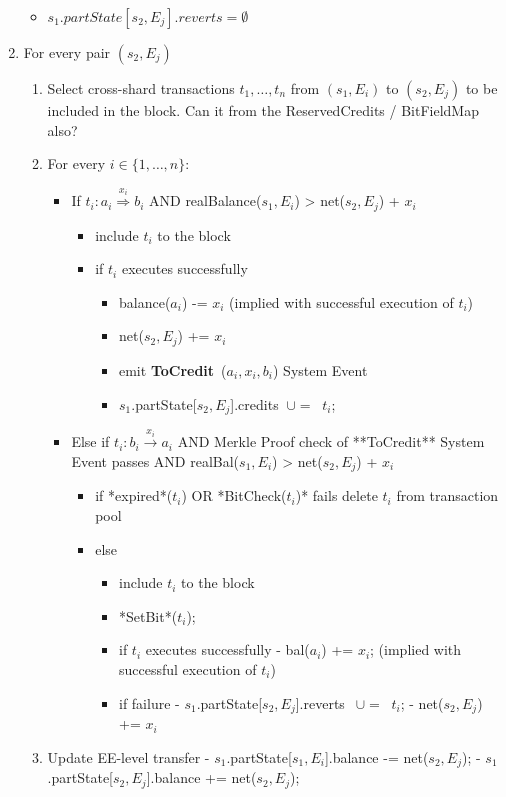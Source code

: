 \documentclass{article}
\newcommand{\tocredit}[0]{{\bf ToCredit}~}
\begin{document}
\begin{enumerate}
\begin{itemize}
	\item $s_1.partState[s_2,E_j].reverts = \emptyset$
\end{itemize}
\item For every pair $(s_2,E_j)$
    \begin{enumerate}
	\item Select cross-shard transactions $t_1,\ldots,t_n$ from $(s_1,E_i)$ to $(s_2,E_j)$ to be included in the block. Can it from the ReservedCredits / BitFieldMap also?
	\item For every $i \in \{1, \ldots, n\}$: 
		\begin{itemize}
		\item If $t_i : a_i \stackrel{x_i}{\Longrightarrow} b_i$ AND realBalance($s_1,E_i$) > net($s_2,E_j$) + $x_i$
		\begin{itemize}
			\item include $t_i$ to the block
			\item if $t_i$ executes successfully 
			\begin{itemize}
				\item balance($a_i$) -= $x_i$ (implied with successful execution of $t_i$)
				\item net($s_2,E_j$) += $x_i$
				\item emit \tocredit($a_i, x_i, b_i$) System Event
				\item $s_1$.partState[$s_2,E_j$].credits $~ \cup= ~$ {$t_i$};
			\end{itemize}
		\end{itemize}
		\item Else if $t_i : b_i \stackrel{x_i}{\longrightarrow} a_i$ AND Merkle Proof check of **ToCredit** System Event passes AND realBal($s_1,E_i$) > net($s_2,E_j$) + $x_i$
		\begin{itemize}
			\item if *expired*($t_i$) OR *BitCheck($t_i$)* fails
				 delete $t_i$ from transaction pool
			\item else 
			\begin{itemize}
				\item include $t_i$ to the block
				\item *SetBit*($t_i$);
				\item if $t_i$ executes successfully
					- bal($a_i$) += $x_i$; (implied with successful execution of $t_i$)
				\item if failure 
					- $s_1$.partState[$s_2,E_j$].reverts $~~\cup=~$ {$t_i$};
					- net($s_2,E_j$) += $x_i$ 
			\end{itemize}
		\end{itemize}
	\end{itemize}
	\item Update EE-level transfer
		- $s_1$.partState[$s_1,E_i$].balance -= net($s_2,E_j$); 
		- $s_1$.partState[$s_2,E_j$].balance += net($s_2,E_j$);
    \end{enumerate}
\end{enumerate}
\end{document}
